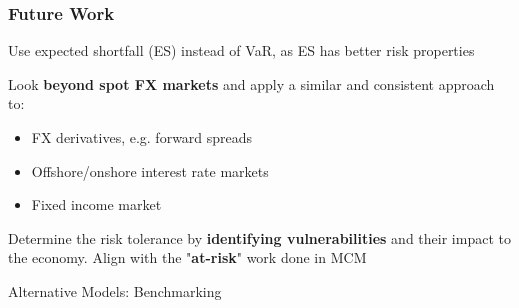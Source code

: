 \documentclass{beamer}
\newenvironment{largeenumerate}{\enumerate\addtolength{\itemsep}{10pt}}{\endenumerate}
\begin{document}
\begin{frame}
  \frametitle{Future Work}
  \begin{largeenumerate}
    \item Use expected shortfall (ES) instead of VaR, as ES has better risk
      properties
    \item Look \textbf{beyond spot FX markets} and apply a similar and consistent
      approach to:
      \begin{itemize}
      \item FX derivatives, e.g. forward spreads
      \item Offshore/onshore interest
        rate markets
      \item Fixed income market 
      \end{itemize}
   \item Determine the risk tolerance by \textbf{identifying vulnerabilities} and their
     impact to the economy. Align with the "\textbf{at-risk}" work done in MCM
  \end{largeenumerate}
\end{frame}



\begin{frame}{Alternative Models: Benchmarking}
\setlength\tabcolsep{2pt}  %
\tiny  %

\normalsize
\end{frame}



\end{document}
